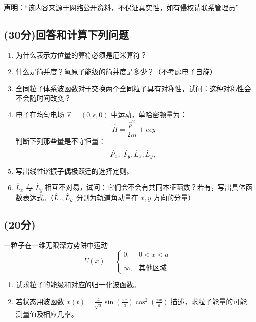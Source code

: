 
\textbf{声明}：“该内容来源于网络公开资料，不保证真实性，如有侵权请联系管理员”

\subsection{(30分)回答和计算下列问题}
\begin{enumerate}
    \item 为什么表示方位量的算符必须是厄米算符？
    \item 什么是简并度？氢原子能级的简并度是多少？（不考虑电子自旋）
    \item 全同粒子体系波函数对于交换两个全同粒子具有对称性，试问：这种对称性会不会随时间改变？
    \item 电子在均匀电场 $\vec{\epsilon}=(0, \epsilon, 0)$ 中运动，单哈密顿量为：
      \[      \hat{H} = \frac{\hat{p}^2}{2m} + e\epsilon y ~\]
      判断下列那些量是不守恒量：
      \[      \hat{P}_x,\ \hat{P}_y,\\  \hat{L}_x,\\ \hat{L}_y,\\  ~\]
    \item 写出线性谐振子偶极跃迁的选择定则。
    \item $\hat{L}_x$ 与 $\hat{L}_y$ 相互不对易，试问：它们会不会有共同本征函数？若有，写出具体函数表达式。（$\hat{L}_x,\\ \hat{L}_y$ 分别为轨道角动量在 $x, y$ 方向的分量）
  \end{enumerate}
  
\subsection{(20分)}
一粒子在一维无限深方势阱中运动
  \[  U(x) =  \begin{cases}    0, & 0 < x < a \\\\    \infty, & \text{其他区域}  \end{cases} ~\]
  \begin{enumerate}
    \item 试求粒子的能级和对应的归一化波函数。
    \item 若状态用波函数 $x(t) = \frac{4}{\sqrt{a}} \sin\left( \frac{\pi x}{a} \right) \cos^2\left( \frac{\pi x}{a} \right)$ 描述，求粒子能量的可能测量值及相应几率。
  \end{enumerate}
